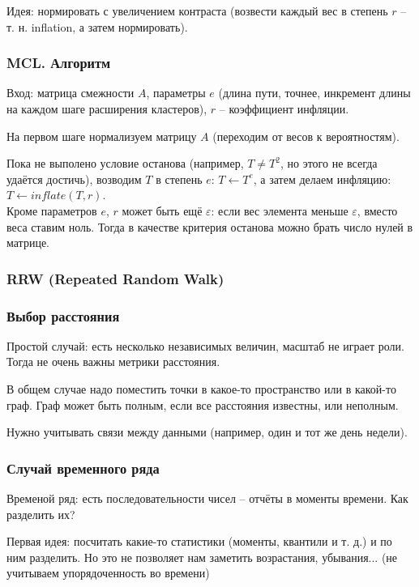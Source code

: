 \documentclass[main.tex]{subfiles}
\begin{document}
Идея: нормировать с увеличением контраста (возвести каждый вес в степень $r$ -- т. н. inflation, а затем нормировать).

\subsubsection{MCL. Алгоритм}

Вход: матрица смежности $A$, параметры $e$ (длина пути, точнее, инкремент длины на каждом шаге расширения кластеров), $r$ -- коэффициент инфляции.

На первом шаге нормализуем матрицу $A$ (переходим от весов к вероятностям).

Пока не выполено условие останова (например, $ T \ne T^2 $, но этого не всегда удаётся достичь),
возводим $T$ в степень $e$: $ T \leftarrow T^e $, а затем делаем инфляцию: $ T \leftarrow inflate(T, r) $. \\

Кроме параметров $e$, $r$ может быть ещё $ \varepsilon $: если вес элемента меньше $\varepsilon$, вместо веса ставим ноль.
Тогда в качестве критерия останова можно брать число нулей в матрице.

\subsubsection{RRW (Repeated Random Walk)}


\subsubsection{Выбор расстояния}

Простой случай: есть несколько независимых величин, масштаб не играет роли.
Тогда не очень важны метрики расстояния.

В общем случае надо поместить точки в какое-то пространство или в какой-то граф.
Граф может быть полным, если все расстояния известны, или неполным.

Нужно учитывать связи между данными (например, один и тот же день недели).

\subsubsection{Случай временного ряда}

Временой ряд: есть последовательности чисел -- отчёты в моменты времени.
Как разделить их?

Первая идея: посчитать какие-то статистики (моменты, квантили и т. д.) и по ним разделить.
Но это не позволяет нам заметить возрастания, убывания...
(не учитываем упорядоченность во времени)
\end{document}
